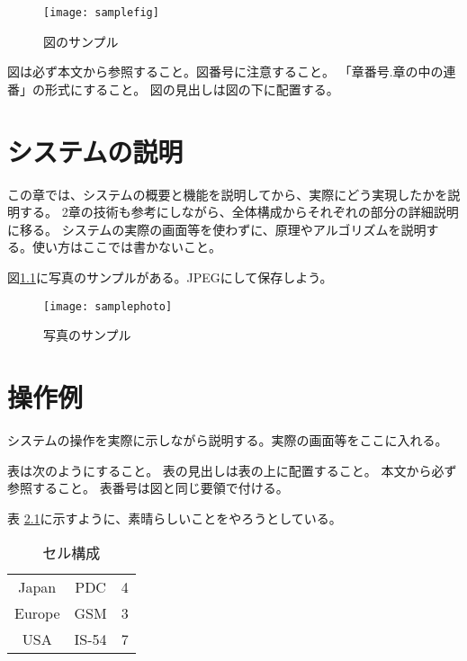 \documentclass[12pt]{jreport}
\begin{document}
\begin{figure}[htb]
    \begin{center}
        \texttt{[image: samplefig]}
    \end{center}
    \caption{図のサンプル
        \label{fig:pm1}
    }
\end{figure}

図は必ず本文から参照すること。図番号に注意すること。
「章番号.章の中の連番」の形式にすること。
図の見出しは図の下に配置する。

\chapter{システムの説明}
この章では、システムの概要と機能を説明してから、実際にどう実現したかを説明する。
2章の技術も参考にしながら、全体構成からそれぞれの部分の詳細説明に移る。
システムの実際の画面等を使わずに、原理やアルゴリズムを説明する。使い方はここでは書かないこと。

図\ref{fig:pm2}に写真のサンプルがある。JPEGにして保存しよう。

\begin{figure}[htb]
    \begin{center}
        \texttt{[image: samplephoto]}
    \end{center}
    \caption{写真のサンプル
        \label{fig:pm2}
    }
\end{figure}

\chapter{操作例}
システムの操作を実際に示しながら説明する。実際の画面等をここに入れる。

表は次のようにすること。
表の見出しは表の上に配置すること。
本文から必ず参照すること。
表番号は図と同じ要領で付ける。

表 \ref{tab:c1}に示すように、素晴らしいことをやろうとしている。

\begin{table}[htb]
    \caption{セル構成
        \label{tab:c1}
    }
    \begin{center}
        \begin{tabular}{ccc}
            \hline
            Japan  & PDC   & 4 \\
            Europe & GSM   & 3 \\
            USA    & IS-54 & 7 \\
            \hline
        \end{tabular}
    \end{center}
\end{table}
\end{document}

